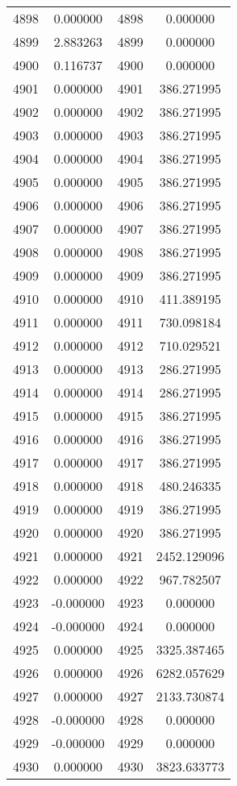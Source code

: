 \documentclass[12pt]{article}
\begin{document}
\begin{longtable}{@{}cccc@{}}
4898 & 0.000000 & 4898 & 0.000000 \\
4899 & 2.883263 & 4899 & 0.000000 \\
4900 & 0.116737 & 4900 & 0.000000 \\
4901 & 0.000000 & 4901 & 386.271995 \\
4902 & 0.000000 & 4902 & 386.271995 \\
4903 & 0.000000 & 4903 & 386.271995 \\
4904 & 0.000000 & 4904 & 386.271995 \\
4905 & 0.000000 & 4905 & 386.271995 \\
4906 & 0.000000 & 4906 & 386.271995 \\
4907 & 0.000000 & 4907 & 386.271995 \\
4908 & 0.000000 & 4908 & 386.271995 \\
4909 & 0.000000 & 4909 & 386.271995 \\
4910 & 0.000000 & 4910 & 411.389195 \\
4911 & 0.000000 & 4911 & 730.098184 \\
4912 & 0.000000 & 4912 & 710.029521 \\
4913 & 0.000000 & 4913 & 286.271995 \\
4914 & 0.000000 & 4914 & 286.271995 \\
4915 & 0.000000 & 4915 & 386.271995 \\
4916 & 0.000000 & 4916 & 386.271995 \\
4917 & 0.000000 & 4917 & 386.271995 \\
4918 & 0.000000 & 4918 & 480.246335 \\
4919 & 0.000000 & 4919 & 386.271995 \\
4920 & 0.000000 & 4920 & 386.271995 \\
4921 & 0.000000 & 4921 & 2452.129096 \\
4922 & 0.000000 & 4922 & 967.782507 \\
4923 & -0.000000 & 4923 & 0.000000 \\
4924 & -0.000000 & 4924 & 0.000000 \\
4925 & 0.000000 & 4925 & 3325.387465 \\
4926 & 0.000000 & 4926 & 6282.057629 \\
4927 & 0.000000 & 4927 & 2133.730874 \\
4928 & -0.000000 & 4928 & 0.000000 \\
4929 & -0.000000 & 4929 & 0.000000 \\
4930 & 0.000000 & 4930 & 3823.633773 \\

\end{longtable}
\end{document}
